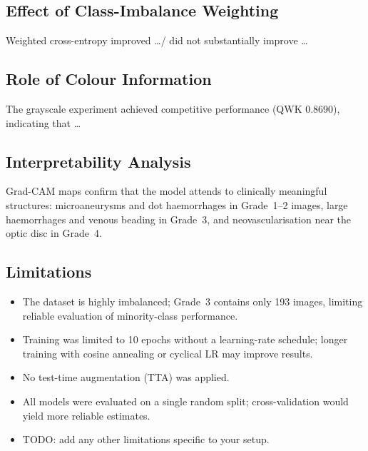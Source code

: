 \documentclass[12pt, a4paper]{article}
\begin{document}
\subsection{Effect of Class-Imbalance Weighting}
\label{ssec:disc_imbalance}

Weighted cross-entropy improved \ldots / did not substantially improve \ldots

\subsection{Role of Colour Information}
\label{ssec:disc_colour}

The grayscale experiment achieved competitive performance (QWK 0.8690), indicating
that \ldots

\subsection{Interpretability Analysis}
\label{ssec:disc_xai}

Grad-CAM maps confirm that the model attends to clinically meaningful structures:
microaneurysms and dot haemorrhages in Grade~1--2 images, large haemorrhages and
venous beading in Grade~3, and neovascularisation near the optic disc in Grade~4.

\subsection{Limitations}
\label{ssec:limitations}

\begin{itemize}
    \item The dataset is highly imbalanced; Grade~3 contains only 193 images,
          limiting reliable evaluation of minority-class performance.
    \item Training was limited to 10 epochs without a learning-rate schedule;
          longer training with cosine annealing or cyclical LR may improve results.
    \item No test-time augmentation (TTA) was applied.
    \item All models were evaluated on a single random split; cross-validation
          would yield more reliable estimates.
    \item TODO: add any other limitations specific to your setup.
\end{itemize}
\end{document}
